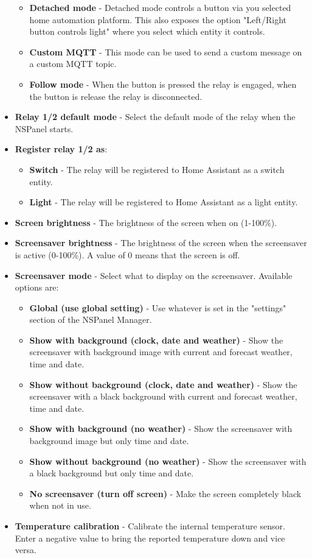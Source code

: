 \documentclass[10pt]{article}
\begin{document}
\begin{itemize}
\begin{itemize}
        \item \textbf{Detached mode} - Detached mode controls a button via you selected home automation platform. This also exposes the option "Left/Right button controls light" where you select which entity it controls.
        \item \textbf{Custom MQTT} - This mode can be used to send a custom message on a custom MQTT topic.
        \item \textbf{Follow mode} - When the button is pressed the relay is engaged, when the button is release the relay is disconnected.
      \end{itemize}
      \item \textbf{Relay 1/2 default mode} - Select the default mode of the relay when the NSPanel starts.
      \item \textbf{Register relay 1/2 as}:
        \begin{itemize}
          \item \textbf{Switch} - The relay will be registered to Home Assistant as a switch entity.
          \item \textbf{Light} - The relay will be registered to Home Assistant as a light entity.
        \end{itemize}
      \item \textbf{Screen brightness} - The brightness of the screen when on (1-100\%).
      \item \textbf{Screensaver brightness} - The brightness of the screen when the screensaver is active (0-100\%). A value of 0 means that the screen is off.
      \item \textbf{Screensaver mode} - Select what to display on the screensaver. Available options are:
      \begin{itemize}
        \item \textbf{Global (use global setting)} - Use whatever is set in the "settings" section of the NSPanel Manager.
        \item \textbf{Show with background (clock, date and weather)} - Show the screensaver with background image with current and forecast weather, time and date.
        \item \textbf{Show without background (clock, date and weather)} - Show the screensaver with a black background with current and forecast weather, time and date.
        \item \textbf{Show with background (no weather)} - Show the screensaver with background image but only time and date.
        \item \textbf{Show without background (no weather)} - Show the screensaver with a black background but only time and date.
        \item \textbf{No screensaver (turn off screen)} - Make the screen completely black when not in use.
      \end{itemize}
      \item \textbf{Temperature calibration} - Calibrate the internal temperature sensor. Enter a negative value to bring the reported temperature down and vice versa.
    \end{itemize}
    
\end{document}
